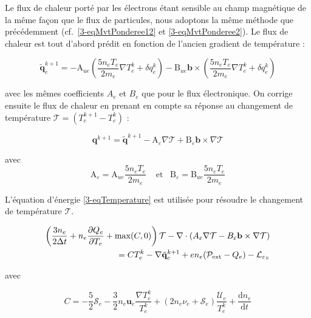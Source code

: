 \begin{refsection}
Le flux de chaleur porté par les électrons étant sensible au champ magnétique de
la même façon que le flux de particules, nous adoptons la même méthode que
précédemment (cf.~\eqref{3-eqMvtPonderee12} et \eqref{3-eqMvtPonderee2}). Le
flux de chaleur est tout d'abord prédit en fonction de l'ancien gradient de température :

\begin{equation}
\label{3-eqChaleurPonderee}
\tilde{\mathbf{q}}_e^{k+1}=-\text{A}_{ue}(
\frac{5n_eT_e}{2m_e}\nabla T_e^k+\delta q_e^k)-\text{B}_{ue}\mathbf
b\times(\frac{5n_eT_e}{2m_e}\nabla T_e^k +\delta q_e^k)
\end{equation}

avec les mêmes coefficients $A_e$ et $B_e$ que pour le flux électronique. On
corrige ensuite le flux de chaleur en prenant en compte sa réponse au changement
de température $\mathcal T=(T_e^{k+1}-T_e^k)$ :

\begin{equation}
\label{3-eqCorrectionVitesse}
\mathbf q^{k+1} = \tilde{\mathbf q}^{k+1}-\text{A}_\varepsilon\nabla
\mathcal T+\text{B}_\varepsilon\mathbf b\times\nabla
\mathcal T
\end{equation}

avec 
\begin{equation*}
\label{3-coefficientsChaleur}
\text{A}_\varepsilon=\text{A}_{ue}\frac{5n_eT_e}{2m_e}\;\;\;\;\text{et}\;\;\;\text{B}_\varepsilon=\text{B}_{ue}\frac{5n_eT_e}{2m_e}
\end{equation*}

L'équation d'énergie \eqref{3-eqTemperature} est utilisée pour résoudre le
changement de température $\mathcal T$. 

\begin{equation}
\label{3-eqTemperature2}
\begin{split}
\left(\frac{3n_e}{2\Delta
t}+n_e\frac{\partial Q_e}{\partial T_e}+\max(C,0)\right)\mathcal T
-\nabla\cdot\left(A_\varepsilon\nabla\mathcal T- B_\varepsilon\mathbf
b\times\nabla\mathcal T\right)\\ =  C T_e^k -\nabla\tilde{\mathbf q}_e^{k+1}+
en_e(\mathcal{P}_\text{ext}-Q_e)-\mathcal L_{\varepsilon_\para}
\end{split}\end{equation}

avec 

\begin{equation*}C=-\frac{5}{2}\mathcal S_e-\frac{3}{2}n_e\mathbf
u_e\frac{\nabla
T_e^k}{T_e^k}+(2n_e\nu_e+\mathcal{S}_e)\frac{\mathcal{U}_e}{T_e^k} +\frac{\text{d} n_e}{\text{d} t}
\end{equation*}


\end{refsection}
